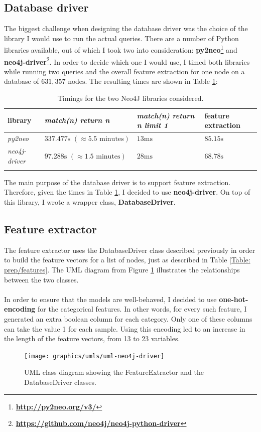 	\subsection{Database driver} \label{Section: impl/neo4j/driver}
	The biggest challenge when designing the database driver was the choice of the library I would use to run the actual queries. There are a number of Python libraries available, out of which I took two into consideration: \textbf{py2neo}\footnote{\textbf{\url{http://py2neo.org/v3/}}} and \textbf{neo4j-driver}\footnote{\textbf{\url{https://github.com/neo4j/neo4j-python-driver}}}. In order to decide which one I would use, I timed both libraries while running two queries and the overall feature extraction for one node on a database of $631, 357 \text{ nodes}$. The resulting times are shown in Table \ref{Table: impl/neo4j-driver-timings}:
	\begin{longtable}{|p{}|p{}p{}p{}|}
		\textbf{library} & \textbf{\textit{match(n) return n}} & \textbf{\textit{match(n) return n limit 1}} & \textbf{feature extraction} \\
		\hline
		\textit{py2neo} & $337.477\text{s } (\approx5.5 \text{ minutes})$ & $13\text{ms}$ & $85.15\text{s}$ \\ 
		\textit{neo4j-driver} & $97.288\text{s }(\approx1.5 \text{ minutes})$ & $28\text{ms}$ & $68.78\text{s}$  \\
		\hline
		\caption[Neo4J libraries timings]{\centering Timings for the two Neo4J libraries considered.}
		\label{Table: impl/neo4j-driver-timings}
	\end{longtable}
	The main purpose of the database driver is to support feature extraction. Therefore, given the times in Table \ref{Table: impl/neo4j-driver-timings}, I decided to use \textbf{neo4j-driver}. On top of this library, I wrote a wrapper class, \textbf{DatabaseDriver}. 
	\subsection{Feature extractor} \label{Section: impl/neo4j/features}
	The feature extractor uses the DatabaseDriver class described previously in order to build the feature vectors for a list of nodes, just as described in Table \ref{Table: prep/features}. The UML diagram from Figure \ref{Fig: impl/neo4j-driver-uml} illustrates the relationships between the two classes.
	\\ \\
	In order to ensure that the models are well-behaved, I decided to use \textbf{one-hot-encoding} for the categorical features. In other words, for every such feature, I generated an extra boolean column for each category. Only one of these columns can take the value 1 for each sample. Using this encoding led to an increase in the length of the feature vectors, from 13 to 23 variables. 
	\begin{figure}[H]
		\centering
		\texttt{[image: graphics/umls/uml-neo4j-driver]}
		\caption[FeatureExtractor UML class diagram]{\centering UML class diagram showing the FeatureExtractor and the DatabaseDriver classes.}
		\label{Fig: impl/neo4j-driver-uml}
	\end{figure}
